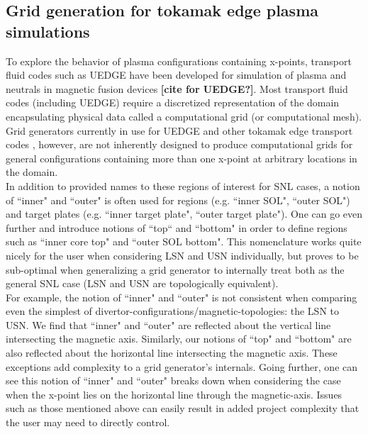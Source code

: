 \subsection{Grid generation for tokamak edge plasma simulations}
To explore the behavior of plasma configurations containing x-points, transport fluid codes such as UEDGE have been developed for simulation of plasma and neutrals in magnetic fusion devices \textbf{[cite for UEDGE?]}. Most transport fluid codes (including UEDGE) require a discretized representation of the domain encapsulating physical data called a computational grid (or computational mesh). Grid generators currently in use for UEDGE and other tokamak edge transport codes \cite{MARCHAND1996232, DUDSON20091467}, however, are not inherently designed to produce computational grids for general configurations containing more than one x-point at arbitrary locations in the domain.\\ \indent
In addition to provided names to these regions of interest for SNL cases, a notion of ``inner" and ``outer" is often used for regions (e.g. ``inner SOL", ``outer SOL") and target plates (e.g. ``inner target plate", ``outer target plate"). One can go even further and introduce notions of ``top`` and ``bottom" in order to define regions such as ``inner core top" and ``outer SOL bottom". This nomenclature works quite nicely for the user when considering LSN and USN individually, but proves to be sub-optimal when generalizing a grid generator to internally treat both as the general SNL case (LSN and USN are topologically equivalent). \\ \indent
For example, the notion of ``inner" and ``outer" is not consistent when comparing even the simplest of divertor-configurations/magnetic-topologies: the LSN to USN. We find that ``inner" and ``outer" are reflected about the vertical line intersecting the magnetic axis. Similarly, our notions of ``top" and ``bottom" are also reflected about the horizontal line intersecting the magnetic axis. These exceptions add complexity to a grid generator's internals. Going further, one can see this notion of ``inner" and ``outer" breaks down when considering the case when the x-point lies on the horizontal line through the magnetic-axis. Issues such as those mentioned above can easily result in added project complexity that the user may need to directly control.\\ \indent

